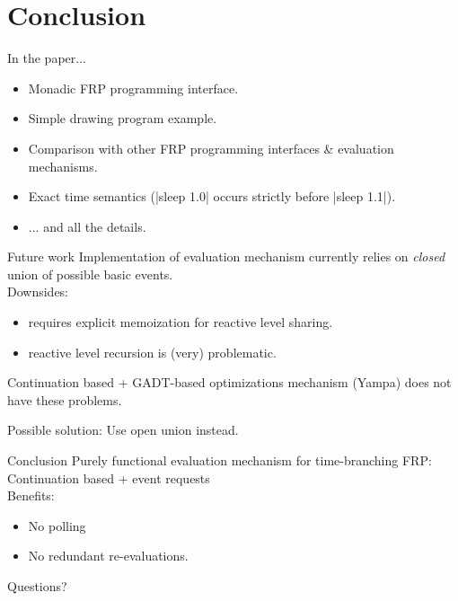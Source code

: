 \documentclass{beamer}
\begin{document}
\section{Conclusion}

\begin{frame}{In the paper...}
\begin{itemize}
\item Monadic FRP programming interface.
\item Simple drawing program example.
\item Comparison with other FRP programming interfaces \& evaluation mechanisms.
\item Exact time semantics (|sleep 1.0| occurs strictly before |sleep 1.1|).

\item ... and all the details.
\end{itemize}

\end{frame}


\begin{frame}{Future work}
Implementation of evaluation mechanism currently relies on \emph{closed} union of possible basic events.\\
Downsides:
\begin{itemize}
\item requires explicit memoization for reactive level sharing.
\item reactive level recursion is (very) problematic.
\end{itemize}
Continuation based + GADT-based optimizations mechanism (Yampa) does not have these problems.\\

\vspace{0.5cm}

Possible solution: Use open union instead.
\end{frame}









\begin{frame}{Conclusion}
\noindent Purely functional evaluation mechanism for time-branching FRP:\\
\hspace{0.5cm}Continuation based + event requests\\
Benefits:
\begin{itemize}
\item No polling
\item No redundant re-evaluations.
\end{itemize}
\pause
Questions?
\end{frame}
\end{document}
